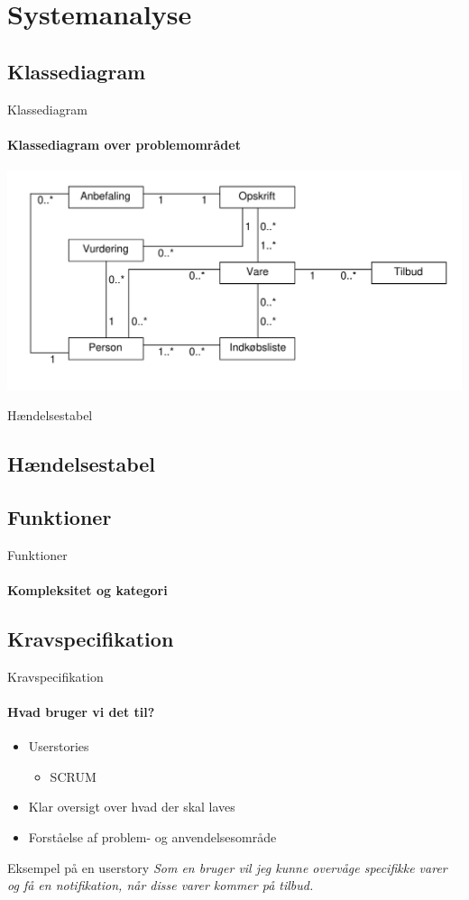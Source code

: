\section{Systemanalyse}
\subsection{Klassediagram}
\begin{frame}{Klassediagram}
	\framesubtitle{Klassediagram over problemområdet}
	\includegraphics[width=1\textwidth]{images/klassediagram_model_simple.pdf}
\end{frame}
\begin{frame}{Hændelsestabel}
\subsection{Hændelsestabel}
	\framesubtitle{}
	
\end{frame}
\subsection{Funktioner}
\begin{frame}{Funktioner}
	\framesubtitle{Kompleksitet og kategori}
	
\end{frame}

\subsection{Kravspecifikation}
\begin{frame}{Kravspecifikation}
	\framesubtitle{Hvad bruger vi det til?}
	\begin{itemize} 
    	\item Userstories
    	\begin{itemize}
    		\item SCRUM
    	\end{itemize}
    	\item Klar oversigt over hvad der skal laves
    	\item Forståelse af problem- og anvendelsesområde
  	\end{itemize}
    \begin{beamerboxesrounded}[upper=headerCol,lower=bodyCol,shadow=true]{Eksempel på en userstory}
    \textit{Som en bruger vil jeg kunne overvåge specifikke varer og få en notifikation, når disse
varer kommer på tilbud.}
    \end{beamerboxesrounded}
\end{frame}

